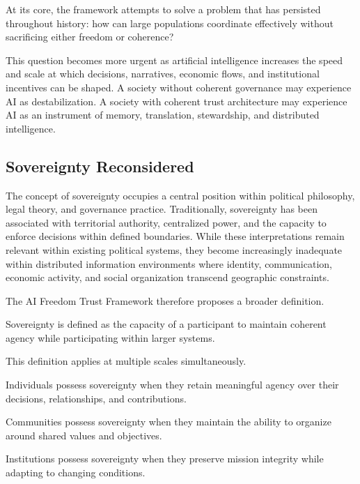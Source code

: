 \documentclass[12pt]{article}
\begin{document}
At its core, the framework attempts to solve a problem that has persisted throughout history: how can large populations coordinate effectively without sacrificing either freedom or coherence?

This question becomes more urgent as artificial intelligence increases the speed and scale at which decisions, narratives, economic flows, and institutional incentives can be shaped. A society without coherent governance may experience AI as destabilization. A society with coherent trust architecture may experience AI as an instrument of memory, translation, stewardship, and distributed intelligence.


\subsection{Sovereignty Reconsidered}

The concept of sovereignty occupies a central position within political philosophy, legal theory, and governance practice. Traditionally, sovereignty has been associated with territorial authority, centralized power, and the capacity to enforce decisions within defined boundaries. While these interpretations remain relevant within existing political systems, they become increasingly inadequate within distributed information environments where identity, communication, economic activity, and social organization transcend geographic constraints.

The AI Freedom Trust Framework therefore proposes a broader definition.

Sovereignty is defined as the capacity of a participant to maintain coherent agency while participating within larger systems.

This definition applies at multiple scales simultaneously.

Individuals possess sovereignty when they retain meaningful agency over their decisions, relationships, and contributions.

Communities possess sovereignty when they maintain the ability to organize around shared values and objectives.

Institutions possess sovereignty when they preserve mission integrity while adapting to changing conditions.
\end{document}

